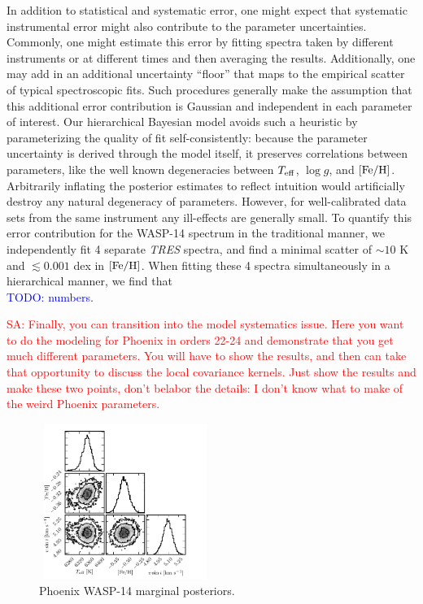 \documentclass[iop,floatfix]{emulateapj}
\newcommand{\Z}{[{\rm Fe}/{\rm H}]}
\newcommand{\todo}[1]{ \textcolor{blue}{\\TODO: #1}}
\newcommand{\comm}[1]{ \textcolor{red}{SA: #1}}
\begin{document}
In addition to statistical and systematic error, one might expect that systematic instrumental error might also contribute to the parameter uncertainties. Commonly, one might estimate this error by fitting spectra taken by different instruments or at different times and then averaging the results. Additionally, one may add in an additional uncertainty ``floor'' that maps to the empirical scatter of typical spectroscopic fits. Such procedures generally make the assumption that this additional error contribution is Gaussian and independent in each parameter of interest. Our hierarchical Bayesian model avoids such a heuristic by
parameterizing the quality of fit self-consistently: because the parameter uncertainty is derived through the model itself, it preserves correlations between parameters, like the well known degeneracies between $T_{\rm eff}$, $\log g$, and $\Z$. Arbitrarily inflating the posterior estimates to reflect intuition would artificially destroy any natural degeneracy of parameters. However, for well-calibrated data sets from the same instrument any ill-effects are generally small. To quantify this error contribution for the WASP-14 spectrum in the traditional manner, we independently fit 4 separate \emph{TRES} spectra, and find a minimal scatter of $\sim10$ K and $\lesssim 0.001$ dex in $\Z$. When fitting these 4 spectra simultaneously in a hierarchical manner, we find that \todo{numbers}.

\comm{Finally, you can transition into the model systematics issue.  Here you want to do the 
modeling for Phoenix in orders 22-24 and demonstrate that you get much different parameters.  You 
will have to show the results, and then can take that opportunity to discuss the local covariance 
kernels.  Just show the results and make these two points, don't belabor the details: I don't 
know what to make of the weird Phoenix parameters.}

\begin{figure}[!htb]
\begin{center}
  \includegraphics[draft, width=0.5\textwidth,height=2in]{figs/PHOENIX_triangle.pdf}
\caption{ {\sc Phoenix} WASP-14 marginal posteriors.}
\label{fig:PHOENIX_posterior}
\end{center}
\end{figure}
\end{document}
